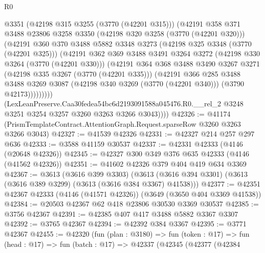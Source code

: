 \begin{lexlean}{R0}
\begin{coremodule}
                @3351
                (@42198 @315 @3255 (@3770 (@42201 @315)))
                (@42191
                  @358
                  @371
                  @3488
                  @23806
                  @3258
                  @3350
                  (@42198 @320 @3258 (@3770 (@42201 @320)))
                  (@42191
                    @360
                    @370
                    @3488
                    @5882
                    @3348
                    @3273
                    (@42198 @325 @3348 (@3770 (@42201 @325)))
                    (@42191
                      @362
                      @369
                      @3488
                      @3491
                      @3264
                      @3272
                      (@42198 @330 @3264 (@3770 (@42201 @330)))
                      (@42191
                        @364
                        @368
                        @3488
                        @3490
                        @3267
                        @3271
                        (@42198 @335 @3267 (@3770 (@42201 @335)))
                        (@42191
                          @366
                          @285
                          @3488
                          @3488
                          @3269
                          @3087
                          (@42198 @340 @3269 (@3770 (@42201 @340)))
                          (@3790 @42173)))))))))
          (LexLeanPreserve.Caa30fedea54bc6d2193091588a045476.R0.__rel_2
            @3248
            @3251
            @3254
            @3257
            @3260
            @3263
            @3266
            @3043))))
@42326 := @41174 (PrismTemplateContract.AttentionGraph.Request.sparseRow @3260 @3263 @3266 @3043)
@42327 := @41539 @42326
@42331 := @42327 @214 @257 @297 @636
@42333 := @3588 @41159 @30537
@42337 := @42331 @42333 (@4146 (@20648 @42326))
@42345 := @42327 @300 @349 @376 @635 @42333 (@4146 (@41562 @42326))
@42351 := @41602 @42326 @379 @404 @419 @634 @3369
@42367 := @3613
    (@3616 @399 @3303)
    (@3613 (@3616 @394 @3301) (@3613 (@3616 @389 @3299) (@3613 (@3616 @384 @3367) @41538)))
@42377 := @42351 @42367 @42333 (@4146 (@41571 @42326)) (@3649 (@3650 @404 @3369 @41538))
@42384 := @20503 @42367 @62 @418 @23806 @30530 @3369 @30537
@42385 := @3756 @42367
@42391 := @42385 @407 @417 @3488 @5882 @3367 @3307
@42392 := @3765 @42367
@42394 := @42392 @384 @3367
@42395 := @3771 @42367
@42455 := @42320
    (fun (plan : @3180) =>
    fun (token : @17) =>
    fun (head : @17) =>
    fun (batch : @17) =>
    @42337
      (@42345
        (@42377
          (@42384

\end{coremodule}
\end{lexlean}
